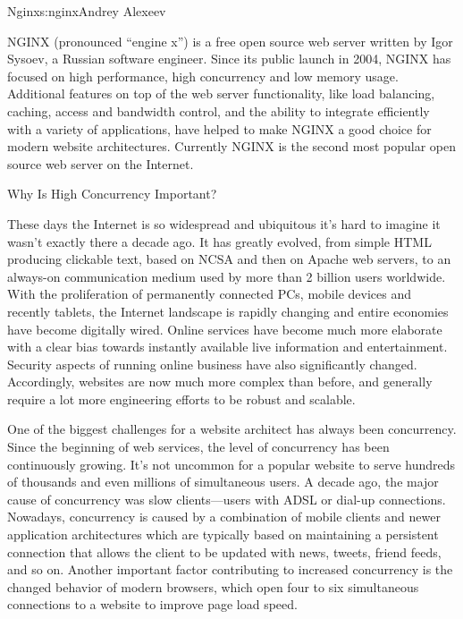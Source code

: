 \begin{aosachapter}{Nginx}{s:nginx}{Andrey Alexeev}

NGINX (pronounced ``engine x'') is a free open source web server
written by Igor Sysoev, a Russian software engineer. Since its public
launch in 2004, NGINX has focused on high performance, high
concurrency and low memory usage. Additional features on top of the
web server functionality, like load balancing, caching, access and
bandwidth control, and the ability to integrate efficiently with a
variety of applications, have helped to make NGINX a good choice for
modern website architectures. Currently NGINX is the second most
popular open source web server on the Internet.

\begin{aosasect1}{Why Is High Concurrency Important?}


These days the Internet is so widespread and ubiquitous it's hard to
imagine it wasn't exactly there a decade ago. It has greatly evolved,
from simple HTML producing clickable text, based on NCSA and then on
Apache web servers, to an always-on communication medium used by more
than 2 billion users worldwide. With the proliferation of permanently
connected PCs, mobile devices and recently tablets, the Internet
landscape is rapidly changing and entire economies have become
digitally wired. Online services have become much more elaborate with
a clear bias towards instantly available live information and
entertainment. Security aspects of running online business have also
significantly changed. Accordingly, websites are now much more complex
than before, and generally require a lot more engineering efforts to
be robust and scalable.

One of the biggest challenges for a website architect has always been
concurrency. Since the beginning of web services, the level of
concurrency has been continuously growing. It's not uncommon for a
popular website to serve hundreds of thousands and even millions of
simultaneous users. A decade ago, the major cause of concurrency was
slow clients---users with ADSL or dial-up connections. Nowadays,
concurrency is caused by a combination of mobile clients and newer
application architectures which are typically based on maintaining a
persistent connection that allows the client to be updated with news,
tweets, friend feeds, and so on. Another important factor contributing
to increased concurrency is the changed behavior of modern browsers,
which open four to six simultaneous connections to a website to
improve page load speed.


\end{aosasect1}
\end{aosachapter}
